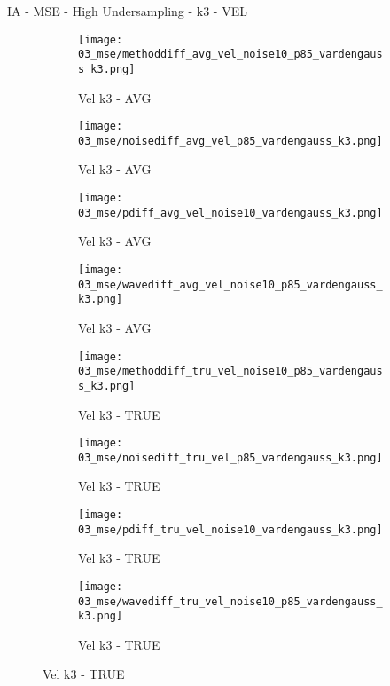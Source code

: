 \documentclass{beamer}
\begin{document}
\begin{frame}{IA - MSE - High Undersampling - k3 - VEL}{}
\begin{figure}
\begin{subfigure}{0.24\textwidth}
\texttt{[image: 03\_mse/methoddiff\_avg\_vel\_noise10\_p85\_vardengauss\_k3.png]}
\vspace{-20pt}
\caption*{\tiny Vel k3 - AVG}
\end{subfigure}
\begin{subfigure}{0.24\textwidth}
\texttt{[image: 03\_mse/noisediff\_avg\_vel\_p85\_vardengauss\_k3.png]}
\vspace{-20pt}
\caption*{\tiny Vel k3 - AVG}
\end{subfigure}
\begin{subfigure}{0.24\textwidth}
\texttt{[image: 03\_mse/pdiff\_avg\_vel\_noise10\_vardengauss\_k3.png]}
\vspace{-20pt}
\caption*{\tiny Vel k3 - AVG}
\end{subfigure}
\begin{subfigure}{0.24\textwidth}
\texttt{[image: 03\_mse/wavediff\_avg\_vel\_noise10\_p85\_vardengauss\_k3.png]}
\vspace{-20pt}
\caption*{\tiny Vel k3 - AVG}
\end{subfigure}

\begin{subfigure}{0.24\textwidth}
\texttt{[image: 03\_mse/methoddiff\_tru\_vel\_noise10\_p85\_vardengauss\_k3.png]}
\vspace{-20pt}
\caption*{\tiny Vel k3 - TRUE}
\end{subfigure}
\begin{subfigure}{0.24\textwidth}
\texttt{[image: 03\_mse/noisediff\_tru\_vel\_p85\_vardengauss\_k3.png]}
\vspace{-20pt}
\caption*{\tiny Vel k3 - TRUE}
\end{subfigure}
\begin{subfigure}{0.24\textwidth}
\texttt{[image: 03\_mse/pdiff\_tru\_vel\_noise10\_vardengauss\_k3.png]}
\vspace{-20pt}
\caption*{\tiny Vel k3 - TRUE}
\end{subfigure}
\begin{subfigure}{0.24\textwidth}
\texttt{[image: 03\_mse/wavediff\_tru\_vel\_noise10\_p85\_vardengauss\_k3.png]}
\vspace{-20pt}
\caption*{\tiny Vel k3 - TRUE}
\end{subfigure}
\end{figure}
\end{frame}
\end{document}
